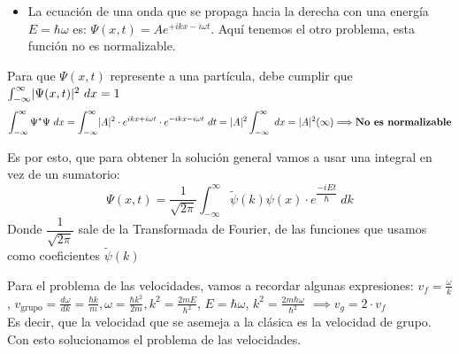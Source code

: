 \documentclass{report}
\begin{document}
{\begin{itemize}
        \item La ecuación de una onda que se propaga hacia la derecha con una energía $E=\hbar\omega$
        es: $\Psi(x,t)=A e^{+ikx-i\omega t}$. Aquí tenemos el otro problema, esta 
        función no es normalizable.\\
        \end{itemize}

        Para que $\Psi(x,t)$ represente a una partícula, debe cumplir que 
        $\int_{-\infty}^{\infty}\lvert\Psi(x,t)\rvert^2\ dx= 1$
        \[\int_{-\infty}^{\infty}\Psi^*\Psi\ dx=\int_{-\infty}^{\infty}\abs{A}^2\cdot 
        e^{ikx+i\omega t}\cdot e^{-ikx-i\omega t}\ dt=\abs{A}^2\int_{-\infty}^{\infty}\ dx=
        \abs{A}^2(\infty)\Longrightarrow\text{\textbf{No es normalizable}}\]

        Es por esto, que para obtener la solución general vamos a usar una integral en vez
        de un sumatorio: 
        \[\Psi(x,t)=\dfrac{1}{\sqrt{2\pi}}\int_{-\infty}^{\infty}\tilde{\psi}(k)\psi(x)
        \cdot e^{\dfrac{-iEt}{\hbar}}\ dk\]
        Donde $\dfrac{1}{\sqrt{2\pi}}$ sale de la Transformada de Fourier, de
        las funciones que usamos como coeficientes $\tilde{\psi}(k)$

        Para el problema de las velocidades, vamos a recordar algunas expresiones:
        $v_f=\frac{\omega}{k}$, $v_\text{grupo}=\frac{d\omega}{dk}=\frac{\hbar k}{m}, 
        \omega = \frac{\hbar k^2}{2m}, k^2=\frac{2mE}{\hbar^2}$, $E=\hbar\omega$,
        $k^2=\frac{2m\hbar\omega}{\hbar^2}$ $\implies v_g=2\cdot v_f$\\

        Es decir, que la velocidad que se asemeja a la clásica es la velocidad de grupo.
        Con esto solucionamos el problema de las velocidades.
      }
\end{document}
